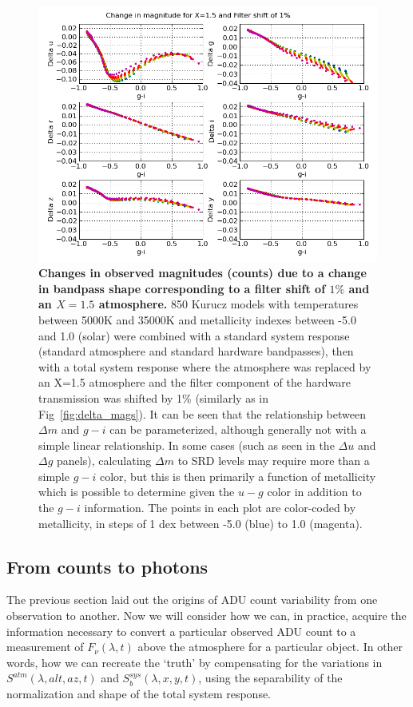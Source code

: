 \documentclass[12pt,preprint]{aastex}
\begin{document}
\begin{figure}[htbp]
\includegraphics[width=6in]{delta_mags2}
\caption{ {\small {\bf Changes in observed magnitudes (counts) due to a
change in bandpass shape corresponding to a filter shift of $1\%$ and
an $X=1.5$ atmosphere.} 850 Kurucz models with temperatures between
5000K and 35000K and metallicity indexes between -5.0 and 1.0 (solar)
were combined with a standard system response (standard atmosphere and
standard hardware bandpasses), then with a total system response where
the atmosphere was replaced by an X=1.5 atmosphere and the filter
component of the hardware transmission was shifted by 1\% (similarly
as in Fig~\ref{fig:delta_mags}).  It can be seen that the relationship
between $\Delta m$ and $g-i$ can be parameterized, although generally
not with a simple linear relationship. In some cases (such as seen in
the $\Delta u$ and $\Delta g$ panels), calculating $\Delta m$ to SRD levels may
require more than a simple $g-i$ color, but this is then primarily a 
function of metallicity which is possible to determine given the $u-g$ color
in addition to the $g-i$ information. The points in each plot are color-coded
by metallicity, in steps of 1 dex between -5.0 (blue) to 1.0 (magenta).}
\label{fig:delta_mags2} }
\end{figure}


\subsection{From counts to photons}
\label{sec:counts2photons}

The previous section laid out the origins of ADU count variability
from one observation to another. Now we will consider how we can, in
practice, acquire the information necessary to convert a particular
observed ADU count to a measurement of $F_\nu(\lambda,t)$ above the
atmosphere for a particular object.  In other words, how we can
recreate the `truth' by compensating for the variations in
$S^{atm}(\lambda,alt,az,t)$ and $S_b^{sys}(\lambda,x,y,t)$, using the
separability of the normalization and shape of the total system
response.
\end{document}
